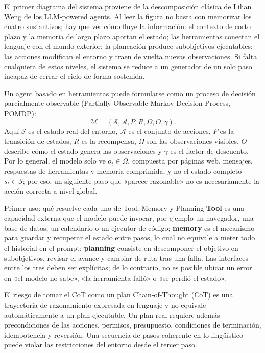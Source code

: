 El primer diagrama del sistema proviene de la descomposición clásica de Lilian Weng de los LLM-powered agents. Al leer la figura no basta con memorizar los cuatro sustantivos; hay que ver cómo fluye la información: el contexto de corto plazo y la memoria de largo plazo aportan el estado; las herramientas conectan el lenguaje con el mundo exterior; la planeación produce subobjetivos ejecutables; las acciones modifican el entorno y traen de vuelta nuevas observaciones. Si falta cualquiera de estos niveles, el sistema se reduce a un generador de un solo paso incapaz de cerrar el ciclo de forma sostenida.


Un agent basado en herramientas puede formularse como un proceso de decisión parcialmente observable (Partially Observable Markov Decision Process, POMDP):
\[
\mathcal{M}=(\mathcal{S},\mathcal{A},P,R,\Omega,O,\gamma).
\]
Aquí $\mathcal{S}$ es el estado real del entorno, $\mathcal{A}$ es el conjunto de acciones, $P$ es la transición de estados, $R$ es la recompensa, $\Omega$ son las observaciones visibles, $O$ describe cómo el estado genera las observaciones y $\gamma$ es el factor de descuento. Por lo general, el modelo solo ve $o_t\in\Omega$, compuesta por páginas web, mensajes, respuestas de herramientas y memoria comprimida, y no el estado completo $s_t\in\mathcal{S}$; por eso, un siguiente paso que «parece razonable» no es necesariamente la acción correcta a nivel global.

\begin{knowledgebox}{Primer uso: qué resuelve cada uno de Tool, Memory y Planning}
\textbf{Tool} es una capacidad externa que el modelo puede invocar, por ejemplo un navegador, una base de datos, un calendario o un ejecutor de código; \textbf{memory} es el mecanismo para guardar y recuperar el estado entre pasos, lo cual no equivale a meter todo el historial en el prompt; \textbf{planning} consiste en descomponer el objetivo en subobjetivos, revisar el avance y cambiar de ruta tras una falla. Las interfaces entre los tres deben ser explícitas; de lo contrario, no es posible ubicar un error en «el modelo no sabe», «la herramienta falló» o «se perdió el estado».
\end{knowledgebox}

\begin{warningbox}{El riesgo de tomar el CoT como un plan}
Chain-of-Thought (CoT) es una trayectoria de razonamiento expresada en lenguaje y no equivale automáticamente a un plan ejecutable. Un plan real requiere además precondiciones de las acciones, permisos, presupuesto, condiciones de terminación, idempotencia y reversión. Una secuencia de pasos coherente en lo lingüístico puede violar las restricciones del entorno desde el tercer paso.
\end{warningbox}

